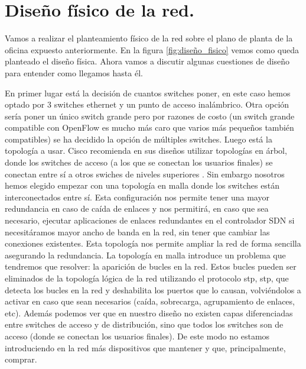 \section{Diseño físico de la red.}

Vamos a realizar el planteamiento físico de la red sobre el plano de planta de la oficina expuesto anteriormente. En la figura \ref{fig:diseño_fisico} vemos como queda planteado el diseño física. Ahora vamos a discutir algunas cuestiones de diseño para entender como llegamos hasta él.

En primer lugar está la decisión de cuantos switches poner, en este caso hemos optado por 3 switches ethernet y un punto de acceso inalámbrico. Otra opción sería poner un único switch grande pero por razones de costo (un switch grande compatible con OpenFlow es mucho más caro que varios más pequeños también compatibles) se ha decidido la opción de múltiples switches. Luego está la topología a usar. Cisco recomienda en sus diseños utilizar topologías en árbol, donde los switches de acceso (a los que se conectan los usuarios finales) se conectan entre sí a otros swiches de niveles superiores \cite{cisco:10.5555/975411}. Sin embargo nosotros hemos elegido empezar con una topología en malla donde los switches están interconectados entre sí. Esta configuración nos permite tener una mayor redundancia en caso de caída de enlaces y nos permitirá, en caso que sea necesario, ejecutar aplicaciones de enlaces redundantes en el controlador SDN si necesitáramos mayor ancho de banda en la red, sin tener que cambiar las conexiones existentes. Esta topología nos permite ampliar la red de forma sencilla asegurando la redundancia. La topología en malla introduce un problema que tendremos que resolver: la aparición de bucles en la red. Estos bucles pueden ser eliminados de la topología lógica de la red utilizando el protocolo \acrshort{stp}, \acrlong{stp}, que detecta los bucles en la red y deshabilita los puertos que lo causan, volviéndolos a activar en caso que sean necesarios (caída, sobrecarga, agrupamiento de enlaces, etc). Además podemos ver que en nuestro diseño no existen capas diferenciadas entre switches de acceso y de distribución, sino que todos los switches son de acceso (donde se conectan los usuarios finales). De este modo no estamos introduciendo en la red más dispositivos que mantener y que, principalmente, comprar.

